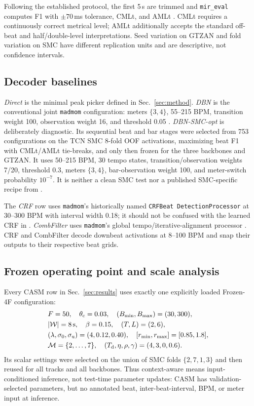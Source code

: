 \documentclass{article}
\begin{document}
Following the established protocol, the first 5\,s are trimmed and \texttt{mir\_eval} computes F1 with $\pm70$\,ms tolerance, CMLt, and AMLt \cite{raffel2014mireval}. CMLt requires a continuously correct metrical level; AMLt additionally accepts the standard off-beat and half/double-level interpretations. Seed variation on GTZAN and fold variation on SMC have different replication units and are descriptive, not confidence intervals.


\subsection{Decoder baselines}
\emph{Direct} is the minimal peak picker defined in Sec.~\ref{sec:method}. \emph{DBN} is the conventional joint \texttt{madmom} configuration: meters $\{3,4\}$, 55--215 BPM, transition weight 100, observation weight 16, and threshold 0.05 \cite{krebs2015dbn}. \emph{DBN-SMC-opt} is deliberately diagnostic. Its sequential beat and bar stages were selected from 753 configurations on the TCN SMC 8-fold OOF activations, maximizing beat F1 with CMLt/AMLt tie-breaks, and only then frozen for the three backbones and GTZAN. It uses 50--215 BPM, 30 tempo states, transition/observation weights 7/20, threshold 0.3, meters $\{3,4\}$, bar-observation weight 100, and meter-switch probability $10^{-7}$. It is neither a clean SMC test nor a published SMC-specific recipe from \cite{bock2020deconstruct}.

The \emph{CRF} row uses \texttt{madmom}'s historically named \texttt{CRFBeat DetectionProcessor} \cite{korzeniowski2014crf} at 30--300 BPM with interval width 0.18; it should not be confused with the learned CRF in \cite{fillon2015crf}. \emph{CombFilter} uses \texttt{madmom}'s global tempo/iterative-alignment processor \cite{bock2015combfilter}. CRF and CombFilter decode downbeat activations at 8--100 BPM and snap their outputs to their respective beat grids.

\subsection{Frozen operating point and scale analysis}
Every CASM row in Sec.~\ref{sec:results} uses exactly one explicitly loaded
Frozen-4F configuration:
\[
\begin{split}
&F=50,\quad \theta_{\mathrm c}=0.03,\quad
(B_{\min},B_{\max})=(30,300),\\
&|\mathcal W|=8{\rm\,s},\quad \beta=0.15,\quad
(T,L)=(2,6),\\
&(\lambda,\sigma_0,\sigma_{\mathrm u})=(4,0.12,0.40),\quad
[r_{\min},r_{\max}]=[0.85,1.8],\\
&\mathcal M=\{2,\ldots,7\},\quad
(T_{\mathrm d},\eta,\rho,\gamma)=(4,3,0,0.6).
\end{split}
\]
Its scalar settings were selected on the union of SMC folds $\{2,7,1,3\}$ and then reused for all tracks and all backbones. Thus context-aware means input-conditioned inference, not test-time parameter updates: CASM has validation-selected parameters, but no annotated beat, inter-beat-interval, BPM, or meter input at inference.
\end{document}

